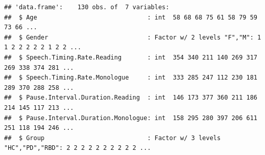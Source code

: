 \documentclass[
  english,
  doc,floatsintext]{apa6}
\begin{document}
\begin{verbatim}
## 'data.frame':    130 obs. of  7 variables:
##  $ Age                              : int  58 68 68 75 61 58 79 59 73 66 ...
##  $ Gender                           : Factor w/ 2 levels "F","M": 1 1 2 2 2 2 2 1 2 2 ...
##  $ Speech.Timing.Rate.Reading       : int  354 340 211 140 269 317 269 338 374 281 ...
##  $ Speech.Timing.Rate.Monologue     : int  333 285 247 112 230 181 289 370 288 258 ...
##  $ Pause.Interval.Duration.Reading  : int  146 173 377 360 211 186 214 145 117 213 ...
##  $ Pause.Interval.Duration.Monologue: int  158 295 280 397 206 611 251 118 194 246 ...
##  $ Group                            : Factor w/ 3 levels "HC","PD","RBD": 2 2 2 2 2 2 2 2 2 2 ...
\end{verbatim}

\begin{table}[!htbp] \centering \renewcommand*{\arraystretch}{1.1}\caption{Summary of the Data Set used in this Analysis}\label{tab:summarize-data-frame}
\end{table}

\newpage
\end{document}
